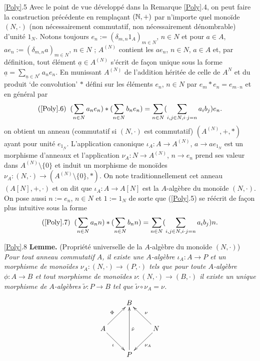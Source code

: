   \ref{Poly}.5 Avec le point de vue développé dans la Remarque  \ref{Poly}.4, on peut faire la construction précédente en rempla\c{c}ant $(\mathbb{N},+)$ par n'importe quel monoïde $(N,\cdot)$ (non nécessairement commutatif, non nécessairement dénombrable) d'unité $1_N$.   Notons toujours $e_{n}:=(\delta_{m,n}1_{A})_{m\in N}$, $n\in N$ et pour $a\in A$, $ae_{n}:=(\delta_{m,n}a)_{m\in  N}$, $n\in N$ ; $A^{(N)}$ contient les $ae_{n}$, $n\in N$, $a\in A$ et, par définition,  tout élément $\underline{a}\in A^{(N)}$ s'écrit de fa\c{c}on unique sous la forme $\underline{a}=\sum_{\underline{n}\in N^r}a_ne_{n}$. En munissant $A^{(N)}$ de l'addition héritée de celle de $A^{N}$ et du produit `de convolution' $*$ défini sur les éléments $e_{n}$, $n\in N$ par 
$e_{m}*e_{n}=e_{m\cdot n} $ et en général par
$$(\ref{Poly}.6)\;\; (\sum_{n\in N}a_{n}e_{n}) *(\sum_{n\in N}b_{n}e_{n})=\sum_{n\in N}(\sum_{i,j\in N,i\cdot j=n}a_{i}b_{j})e_{n}.$$
on obtient un anneau (commutatif si $(N,\cdot)$ est commutatif) $(A^{(N)},+,*)$  ayant pour unité $e_{\underline{1_N}}$. L'application canonique $\iota_A:A\rightarrow A^{(N)}$, $a\rightarrow ae_{1_N}  $  est un morphisme d'anneaux et l'application $\nu_A:N\rightarrow A^{(N)}$, $n\rightarrow e_n$ prend ses valeur dans $A^{(N)}\setminus\lbrace 0\rbrace$ et induit un morphisme de monoïdes $\nu_A:(N,\cdot)\rightarrow (A^{(N)}\setminus\lbrace 0\rbrace,*)$.
 On note traditionnellement cet anneau $(A[N],+,\cdot) $ et on dit que $\iota_A:A\rightarrow A[N]$ est la $A$-algèbre du monoïde $(N,\cdot)$. On pose aussi $n:=e_{n}$, $n\in N$    et $1:=1_N$ de sorte que (\ref{Poly}.5) se réécrit de fa\c{c}on plus intuitive sous la forme
 $$(\ref{Poly}.7)\;\; (\sum_{n\in N}a_{n}n) *(\sum_{n\in N}b_{n}n)=\sum_{n\in N}(\sum_{i,j\in N,i\cdot j=n}a_{i}b_{j})n.$$

 \ref{Poly}.8 \textbf{Lemme.} (Propriété universelle de la $A$-algèbre du monoïde $(N,\cdot)$) \textit{Pour tout anneau commutatif $A$, il existe une $A$-algèbre $\iota_A: A\rightarrow P$ et un  morphisme de monoïdes $\nu_A:(N,\cdot)\rightarrow (P  ,\cdot)$ tels que pour toute $A$-algèbre   $\phi: A\rightarrow B$ et tout morphisme de monoïdes $\nu:(N,\cdot)\rightarrow (B  ,\cdot)$  il existe un unique  morphisme de $A$-algèbres $\tilde{\nu}:P\rightarrow B$  tel que $ \tilde{\nu}\circ \nu_A=\nu$. }

	$$ \xymatrix{ & B \\ A \ar[ru]^\Phi \ar[rd]_\iota & & N \ar[lu]_\nu \ar[ld]^{\nu_A} \\ & P \ar[uu]_{\tilde{\nu} } } $$

